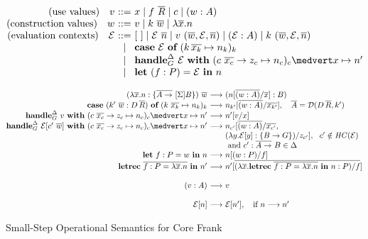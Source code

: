 \documentclass[11pt]{article}
\makeatletter
\newcommand{\EC}{\mathcal{E}}
\newcommand{\many}{\overline}
\newcommand{\reducesto}{\longrightarrow}
\newcommand\ba{\begin{array}}
\newcommand\ea{\end{array}}
\newenvironment{equations}{\[\ba{@{}r@{~}c@{~}l@{}}}{\ea\]\ignorespacesafterend}
\newcommand{\sigs}{\Sigma}
\newcommand{\effbox}[1]{[#1]}
\newcommand{\key}[1]{\textbf{#1}} %
\newcommand{\var}{\mathit}        %
\newcommand{\handleSymbol}{\rightarrow}
\newcommand{\handle}[2]{{#1} \handleSymbol {#2}}
\newcommand{\thunk}[1]{\{{#1}\}}
\newcommand{\adj}{\Delta}
\makeatother
\begin{document}
\begin{figure*}
\small
\begin{equations}
(\textrm{use values}) \quad v &::=& x \mid f~\many{R} \mid c \mid (w : A) \\
(\textrm{construction values}) \quad w &::=& v \mid k~\many{w} \mid \lambda \many{x}.n \\
(\textrm{evaluation contexts})\quad \EC
  &::= & [~] \mid \EC~\many{n} \mid v~(\many{w},\EC,\many{n})
             \mid (\EC : A)
             \mid k~(\many{w},\EC,\many{n})\\
             &\mid& \key{case}~\EC~\key{of}~(k\,\many{x_k} \mapsto n_k)_k \\
  &\mid& \key{handle}^\adj_G~ \EC ~\key{with}~
            (\handle{c~\many{x_c}}{z_c} \mapsto n_c)_c \medvert
            x \mapsto n' \\
  &\mid& \key{let}~(f : P) = \EC~\key{in}~n \\
\end{equations}%

\begin{equations}
(\lambda \many{x}.n : \thunk{\many{A \to}~\effbox{\sigs}B})~\many{w} &\reducesto& (n[\many{(w : A)} / \many{x}] : B) \\
\key{case}~(k'~\many{w} : D\,\many{R})~\key{of}~(k~\many{x_k} \mapsto n_k)_k
  &\reducesto& n_{k'}[\many{(w : A)} / \many{x_{k'}}],
     \quad \many{A} = \dcon(D\,\many{R}, k') \\
\key{handle}^\adj_G~v~\key{with}~(\handle{c~\many{x_c}}{z_c} \mapsto n_c)_c \medvert x \mapsto n'
  &\reducesto& n'[v / x] \\
\key{handle}^\adj_G~\EC[c'~\many{w}]~\key{with}~(\handle{c~\many{x_c}}{z_c} \mapsto n_c)_c \medvert x \mapsto n'
  &\reducesto& n_{c'}[\many{(w : A)} / \many{x_{c'}},\\
  && (\lambda y.\EC[y] : \thunk{B \to G}) / z_{c'}],
  ~~ c' \notin \var{HC}(\EC) \\ 
  && \text{ and }
  c':\many{A \to}~B \in \adj \\
\key{let}~f : P = w~\key{in}~n
  &\reducesto&
    n[(w : P) / f] \\
\key{letrec}~\many{f : P = \lambda \many{x}.n}~\key{in}~n'
  &\reducesto&
    n'[\many{(\lambda \many{x}.\key{letrec}~\many{f : P = \lambda \many{x}.n}~\key{in}~n : P) / f}] \\
\\
(v : A) &\reducesto& v \\
\\
\EC[n] &\reducesto& \EC[n'], \quad \text{if }n \reducesto n' \\
\end{equations}%

\caption{Small-Step Operational Semantics for Core Frank}
\label{fig:semantics}
\end{figure*}
\end{document}
